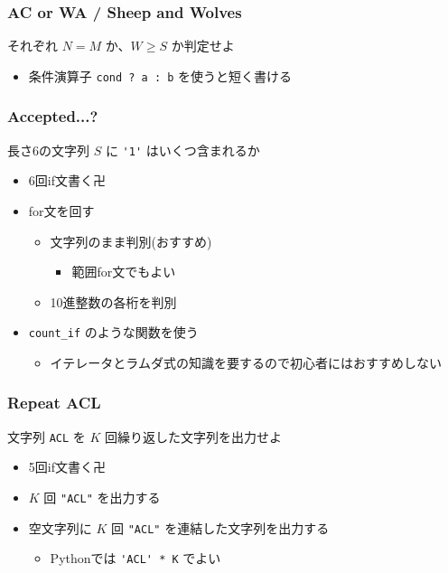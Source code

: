\documentclass[t, aspectratio=169, dvipdfmx]{beamer}
\begin{document}
\begin{frame}[containsverbatim]
  \frametitle{AC or WA / Sheep and Wolves}
  それぞれ $N=M$ か、$W \geq S$ か判定せよ
  \begin{itemize}
    \item 条件演算子 \verb|cond ? a : b| を使うと短く書ける
  \end{itemize}
\end{frame}

\begin{frame}[c]
\end{frame}

\begin{frame}[containsverbatim]
  \frametitle{Accepted...?}
  長さ6の文字列 $S$ に \verb|'1'| はいくつ含まれるか
  \begin{itemize}
    \item 6回if文書く卍
    \item for文を回す
    \begin{itemize}
      \item 文字列のまま判別(おすすめ)
      \begin{itemize}
        \item 範囲for文でもよい
      \end{itemize}
      \item 10進整数の各桁を判別
    \end{itemize}
    \item \verb|count_if| のような関数を使う
    \begin{itemize}
      \item イテレータとラムダ式の知識を要するので初心者にはおすすめしない
    \end{itemize}
  \end{itemize}
\end{frame}

\begin{frame}[containsverbatim]
  \frametitle{Repeat ACL}
  文字列 \verb|ACL| を $K$ 回繰り返した文字列を出力せよ
  \begin{itemize}
    \item 5回if文書く卍
    \item $K$ 回 \verb|"ACL"| を出力する
    \item 空文字列に $K$ 回 \verb|"ACL"| を連結した文字列を出力する
    \begin{itemize}
      \item Pythonでは \verb|'ACL' * K| でよい
    \end{itemize}
  \end{itemize}
\end{frame}
\end{document}
